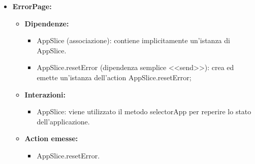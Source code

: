 \begin{itemize}
      \item \textbf{ErrorPage:}
            \begin{itemize}
                  \item \textbf{Dipendenze:}
                        \begin{itemize}
                              \item AppSlice (associazione): contiene implicitamente un'istanza di AppSlice.
                              \item AppSlice.resetError (dipendenza semplice <<send>>): crea ed emette un'istanza
                                    dell'action AppSlice.resetError;
                        \end{itemize}
                  \item \textbf{Interazioni:}
                        \begin{itemize}
                              \item AppSlice: viene utilizzato il metodo selectorApp per reperire lo stato
                                    dell'applicazione.
                        \end{itemize}
                  \item \textbf{Action emesse:}
                        \begin{itemize}
                              \item AppSlice.resetError.
                        \end{itemize}
            \end{itemize}
\end{itemize}

